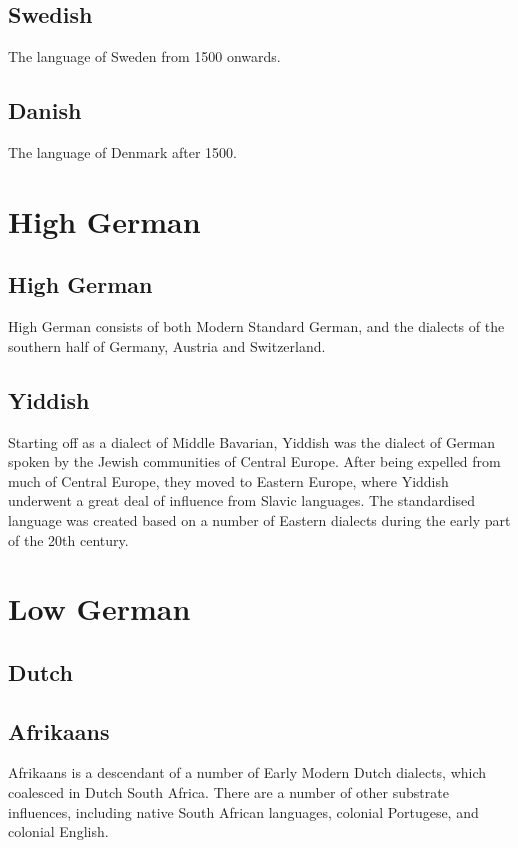 \subsection{Swedish}\label{sec:Swedish}
The language of Sweden from 1500 onwards.

\subsection{Danish}\label{sec:Danish}
The language of Denmark after 1500.

\section{High German}
\subsection{High German}\label{sec:HGerman}
High German consists of both Modern Standard German, and the dialects of the southern half of Germany, Austria and Switzerland.

\subsection{Yiddish}\label{sec:Yiddish}
Starting off as a dialect of Middle Bavarian, Yiddish was the dialect of German spoken by the Jewish communities of Central Europe. After being expelled from much of Central Europe, they moved to Eastern Europe, where Yiddish underwent a great deal of influence from Slavic languages. The standardised language was created based on a number of Eastern dialects during the early part of the 20th century.



\section{Low German}
\subsection{Dutch}\label{sec:Dutch}

\subsection{Afrikaans}\label{sec:Afrikaans}
Afrikaans is a descendant of a number of Early Modern Dutch dialects, which coalesced in Dutch South Africa. There are a number of other substrate influences, including native South African languages, colonial Portugese, and colonial English.

